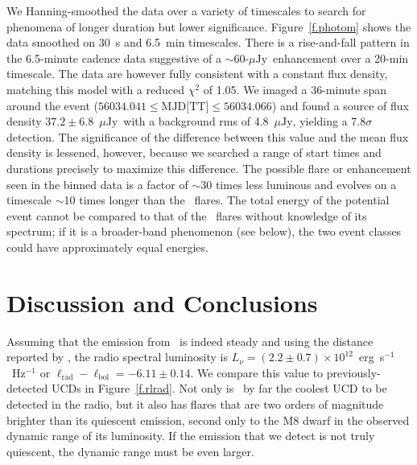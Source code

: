 \documentclass[iop]{emulateapj}
\newcommand\ujy{\ensuremath{\mu\text{Jy}}}
\newcommand\vtwom{2M\,1047+21} %
\newcommand\twom{\object{\vtwom}}
\newcommand\apx{\ensuremath{\sim}}
\begin{document}
We Hanning-smoothed the data over a variety of timescales to search for
phenomena of longer duration but lower significance. Figure~\ref{f.photom}
shows the data smoothed on 30~s and 6.5~min timescales. There is a
rise-and-fall pattern in the 6.5-minute cadence data suggestive of a
\apx60-\ujy\ enhancement over a 20-min timescale. The data are however fully
consistent with a constant flux density, matching this model with a reduced
$\chi^2$ of 1.05. We imaged a 36-minute span around the event ($56034.041 \le
\text{MJD[TT]} \le 56034.066$) and found a source of flux density
$37.2\pm6.8$~\ujy\ with a background rms of 4.8~\ujy, yielding a 7.8$\sigma$
detection. The significance of the difference between this value and the mean
flux density is lessened, however, because we searched a range of start times
and durations precisely to maximize this difference. The possible flare or
enhancement seen in the binned data is a factor of \apx30 times less luminous
and evolves on a timescale \apx10 times longer than the \rw\ flares. The total
energy of the potential event cannot be compared to that of the \rw\ flares
without knowledge of its spectrum; if it is a broader-band phenomenon (see
below), the two event classes could have approximately equal energies.

\section{Discussion and Conclusions}
\label{s.disc}

Assuming that the emission from \twom\ is indeed steady and using the distance
reported by \citet{vhl+04}, the radio spectral luminosity is $L_\nu = (2.2 \pm
0.7) \times 10^{12}$~erg~s$^{-1}$~Hz$^{-1}$ or $\ell_\text{rad} -
\ell_\text{bol} = -6.11 \pm 0.14$. We compare this value to
previously-detected UCDs in Figure~\ref{f.rlrad}. Not only is \twom\ by far
the coolest UCD to be detected in the radio, but it also has flares that are
two orders of magnitude brighter than its quiescent emission, second only to
the M8 dwarf  \citep{bp05} in the observed dynamic
range of its luminosity. If the emission that we detect is not truly
quiescent, the dynamic range must be even larger.
\end{document}
